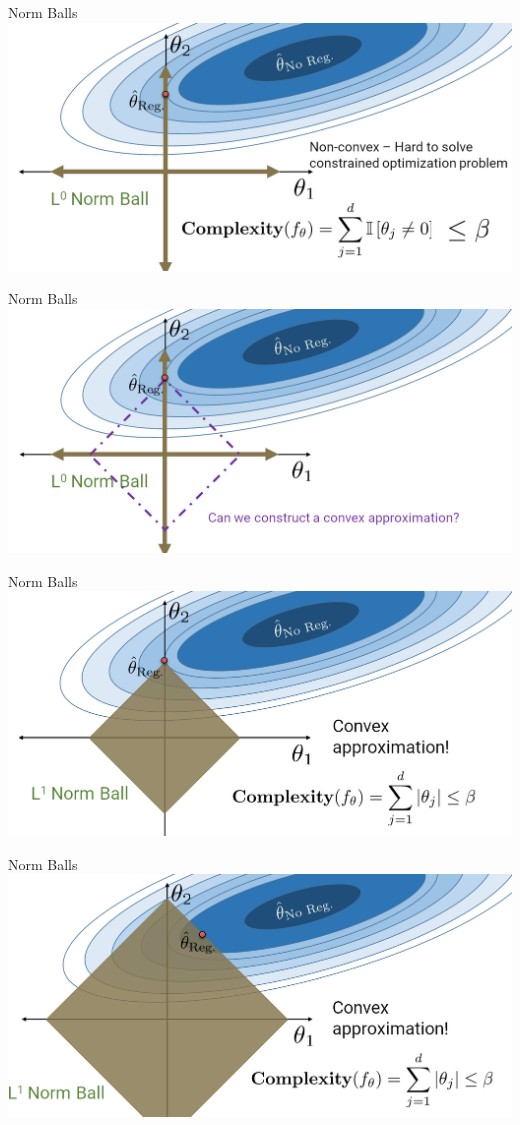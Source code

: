 \documentclass[aspectratio=169]{../latex_main/tntbeamer}  %
\begin{document}
	\begin{frame}{Norm Balls}
	    \includegraphics[scale=.35]{Bild6}
	\end{frame}
	
	\begin{frame}{Norm Balls}
	    \includegraphics[scale=.35]{Bild7}
	\end{frame}
	
	\begin{frame}{Norm Balls}
	    \includegraphics[scale=.35]{Bild8}
	\end{frame}
	
	\begin{frame}{Norm Balls}
	    \includegraphics[scale=.35]{Bild9}
	\end{frame}
	
\end{document}
